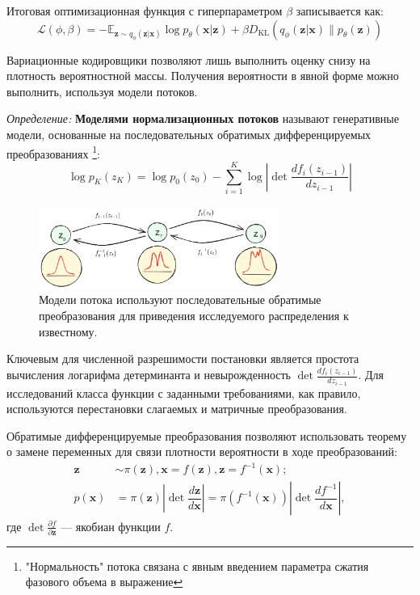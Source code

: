 Итоговая оптимизационная функция с гиперпараметром $\beta$ записывается как:
\begin{equation}
    \mathcal{L}(\phi, \beta) = - \mathbb{E}_{\mathbf{z} \sim q_\phi(\mathbf{z}\vert\mathbf{x})} \log p_\theta(\mathbf{x}\vert\mathbf{z}) + \beta D_\text{KL}(q_\phi(\mathbf{z}\vert\mathbf{x})\|p_\theta(\mathbf{z}))
\end{equation}

Вариационные кодировщики позволяют лишь выполнить оценку снизу на плотность вероятностной массы. 
Получения вероятности в явной форме можно выполнить, используя модели потоков.

\textit{Определение:} \textbf{Моделями нормализационных потоков} называют генеративные модели, 
основанные на последовательных обратимых дифференцируемых преобразованиях 
\footnote{"Нормальность" потока связана с явным введением параметра сжатия фазового объема в выражение}:
\begin{equation}
    \log p_{K}(z_K) = \log p_0(z_0) - \sum_{i=1}^K \log \left|\det \frac{d f_i(z_{i-1})}{d z_{i-1}} \right| 
\end{equation}


\begin{figure}[h]
    \centering
    \includegraphics[width=0.7\textwidth]{assets/ml/generation/flow.excalidraw.png}
    \caption{Модели потока используют последовательные обратимые преобразования для приведения исследуемого распределения к известному.}
    \label{flow}
\end{figure}

Ключевым для численной разрешимости постановки является простота вычисления логарифма детерминанта и невырожденность $\det \frac{d f_i(z_{i-1})}{d z_{i-1}}$. 
Для исследований класса функции с заданными требованиями, как правило, используются перестановки слагаемых и матричные преобразования.

Обратимые дифференцируемые преобразования позволяют использовать теорему о замене переменных для связи плотности вероятности в ходе преобразований:
\begin{equation}
    \begin{aligned}
        \mathbf{z} &\sim \pi(\mathbf{z}), \mathbf{x} = f(\mathbf{z}), \mathbf{z} = f^{-1}(\mathbf{x}); \\
        p(\mathbf{x}) 
        &= \pi(\mathbf{z}) \left\vert \det \dfrac{d \mathbf{z}}{d \mathbf{x}} \right\vert  
        = \pi(f^{-1}(\mathbf{x})) \left\vert \det \dfrac{d f^{-1}}{d \mathbf{x}} \right\vert,
    \end{aligned}
\end{equation}
где $\det \frac{\partial f}{\partial\mathbf{z}}$ --- якобиан функции $f$.


